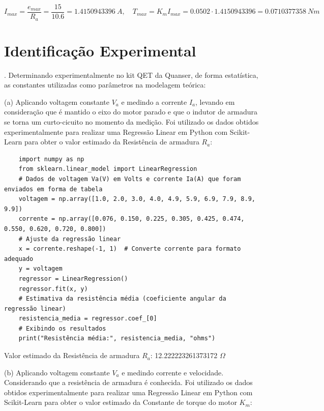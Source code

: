 \documentclass[10pt]{article}
\begin{document}
\begin{equation}
    I_{max} = \frac{e_{max}}{R_a} = \frac{15}{10.6} = 1.4150943396 \ A, \quad T_{max} = K_m I_{max} = 0.0502 \cdot 1.4150943396 = 0.0710377358 \ Nm
\end{equation}

\section{Identificação Experimental}

. Determinando experimentalmente no kit QET da Quanser, de forma estatística,
as constantes utilizadas como parâmetros na modelagem teórica:

\quad (a) Aplicando voltagem constante $V_a$ e medindo a corrente $I_a$,
levando em consideração que é mantido o eixo do motor parado
e que o indutor de armadura se torna um curto-cicuito no momento da medição.
Foi utilizado os dados obtidos experimentalmente para realizar uma Regressão Linear em Python com Scikit-Learn
para obter o valor estimado da Resistência de armadura $R_a$:

\begin{verbatim}
    import numpy as np
    from sklearn.linear_model import LinearRegression
    # Dados de voltagem Va(V) em Volts e corrente Ia(A) que foram enviados em forma de tabela
    voltagem = np.array([1.0, 2.0, 3.0, 4.0, 4.9, 5.9, 6.9, 7.9, 8.9, 9.9])
    corrente = np.array([0.076, 0.150, 0.225, 0.305, 0.425, 0.474, 0.550, 0.620, 0.720, 0.800])
    # Ajuste da regressão linear
    x = corrente.reshape(-1, 1)  # Converte corrente para formato adequado
    y = voltagem
    regressor = LinearRegression()
    regressor.fit(x, y)
    # Estimativa da resistência média (coeficiente angular da regressão linear)
    resistencia_media = regressor.coef_[0]
    # Exibindo os resultados
    print("Resistência média:", resistencia_media, "ohms")
\end{verbatim}

Valor estimado da Resistência de armadura $R_a$: 12.222223261373172 $\Omega$

\quad (b) Aplicando voltagem constante $V_a$ e medindo corrente e velocidade.
Considerando que a resistência de armadura é conhecida. Foi utilizado os dados obtidos
experimentalmente para realizar uma Regressão Linear em Python com Scikit-Learn
para obter o valor estimado da Constante de torque do motor $K_m$:
\end{document}
